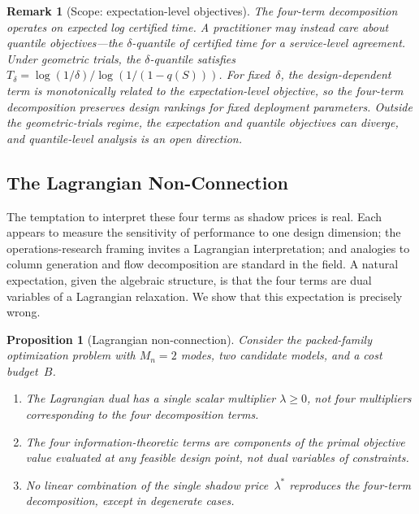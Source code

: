 \documentclass[twoside,11pt]{article}
\newtheorem{proposition}{Proposition}
\newtheorem{remark}{Remark}
\newcommand{\Mn}{M_n}
\begin{document}
\begin{remark}[Scope: expectation-level objectives]
\label{rem:quantile-scoping}
The four-term decomposition operates on expected log certified time.
A practitioner may instead care about quantile objectives---the $\delta$-quantile of certified time for a service-level agreement.
Under geometric trials, the $\delta$-quantile satisfies $T_\delta = \log(1/\delta) / \log(1/(1-q(S)))$.
For fixed~$\delta$, the design-dependent term is monotonically related to the expectation-level objective, so the four-term decomposition preserves design rankings for fixed deployment parameters.
Outside the geometric-trials regime, the expectation and quantile objectives can diverge, and quantile-level analysis is an open direction.
\end{remark}

\subsection{The Lagrangian Non-Connection}
\label{sec:lagrangian}

The temptation to interpret these four terms as shadow prices is real.
Each appears to measure the sensitivity of performance to one design dimension; the operations-research framing invites a Lagrangian interpretation; and analogies to column generation and flow decomposition are standard in the field.
A natural expectation, given the algebraic structure, is that the four terms are dual variables of a Lagrangian relaxation.
We show that this expectation is precisely wrong.

\begin{proposition}[Lagrangian non-connection]
\label{prop:lagrangian}
Consider the packed-family optimization problem with $\Mn = 2$ modes, two candidate models, and a cost budget~$B$.
\begin{enumerate}[label=(\alph*)]
  \item The Lagrangian dual has a single scalar multiplier $\lambda \ge 0$, not four multipliers corresponding to the four decomposition terms.
  \item The four information-theoretic terms are components of the primal objective value evaluated at any feasible design point, not dual variables of constraints.
  \item No linear combination of the single shadow price~$\lambda^*$ reproduces the four-term decomposition, except in degenerate cases.
\end{enumerate}
\end{proposition}
\end{document}
